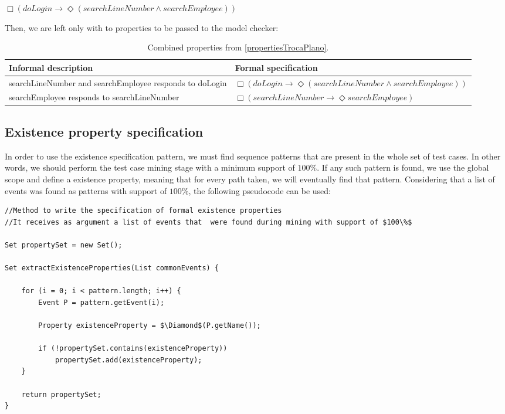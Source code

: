 \begin{center}
$\Box (doLogin \rightarrow \Diamond (searchLineNumber \wedge searchEmployee))$
\end{center}

Then, we are left only with to properties to be passed to the model checker:

\begin{table}[h]
\begin{center}
\begin{tabular}{|p{5cm}| l|}

\hline

Informal description & Formal specification \\ \hline

searchLineNumber and searchEmployee responds to doLogin & $\Box (doLogin \rightarrow \Diamond (searchLineNumber \wedge searchEmployee))$\\ \hline

searchEmployee responds to searchLineNumber & $\Box (searchLineNumber \rightarrow \Diamond searchEmployee)$ \\

\hline
\end{tabular}
\end{center}
\caption{Combined properties from \ref{propertiesTrocaPlano}.}
\label{propertiesTrocaPlanoConcise}
\end{table}

\subsection{Existence property specification}

In order to use the existence specification pattern, we must find sequence patterns that are present in the whole set of test cases. In other words, we should perform the test case mining stage with a minimum support of $100\%$. If any such pattern is found, we use the global scope and define a existence property, meaning that for every path taken, we will eventually find that pattern. Considering that a list of events was found as patterns with support of $100\%$, the following pseudocode can be used:

\begin{lstlisting}[mathescape]
//Method to write the specification of formal existence properties
//It receives as argument a list of events that  were found during mining with support of $100\%$

Set propertySet = new Set();

Set extractExistenceProperties(List commonEvents) {

	for (i = 0; i < pattern.length; i++) {
		Event P = pattern.getEvent(i);

		Property existenceProperty = $\Diamond$(P.getName());

		if (!propertySet.contains(existenceProperty))
			propertySet.add(existenceProperty);
	}

	return propertySet;
}
\end{lstlisting}

